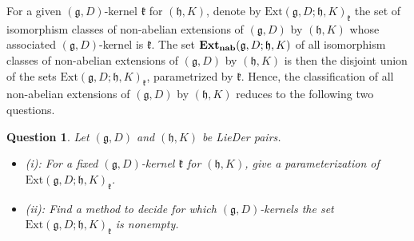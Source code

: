 \documentclass[12pt]{amsart}
\newtheorem{que}[thm]{Question}
\newcommand{\g}{\mathfrak g}
\newcommand{\h}{\mathfrak h}
\newcommand{\frkk}{\mathfrak k}
\newcommand{\LD}{{\rm LieDer }}
\begin{document}
For a given $(\g,D)$-kernel $\frkk$ for $(\h, K)$, denote by $\mathrm{Ext}(\g,D; \h, K)_{\frkk}$ the set of isomorphism classes of non-abelian extensions of $(\g,D)$ by $(\h,K)$ whose associated $(\g,D)$-kernel is $\frkk$. The set ${\rm{\bf Ext_{nab}}}(\g, D;\h, K)$ of all isomorphism classes of non-abelian extensions of $(\g,D)$ by $(\h,K)$ is then the disjoint union of the sets $\mathrm{Ext}(\g,D;\h,K)_{\frkk}$, parametrized by $\frkk$. Hence, the classification of all non-abelian extensions of $(\g, D)$ by $(\h, K)$ reduces to the following two questions.
\begin{que}\label{que12}
Let $(\g, D)$ and $(\h, K)$ be \LD pairs.
\begin{itemize}
\item {\rm(i)}:
For a fixed $(\g,D)$-kernel $\frkk$ for $(\h, K)$, give a parameterization of $\mathrm{Ext}(\g,D;\h,K)_{\frkk}$. 
\item {\rm(ii)}:
Find a method to decide for which $(\g,D)$-kernels the set $\mathrm{Ext}(\g,D;\h,K)_{\frkk}$ is nonempty.
\end{itemize}
\end{que}
\end{document}
